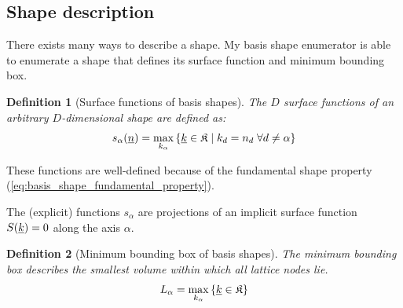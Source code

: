 \documentclass{article}
\newtheorem*{definition}{Definition}
\begin{document}
\subsection{Shape description}
There exists many ways to describe a shape. My basis shape enumerator
is able to enumerate a shape that defines its surface function and
minimum bounding box.

\begin{definition}[Surface functions of basis shapes]
  The \(D\) surface functions of an arbitrary \(D\)-dimensional shape are defined as:
  \begin{equation}
  s_{\alpha}(\underline{n})=\max_{k_{\alpha}}
    \left\{\underline{k} \in \mathfrak{K} \;|\;
      k_d = n_d \; \forall d \neq \alpha
    \right\}
    \label{eq:basis_shape_surface_function}
  \end{equation}
\end{definition}

These functions are well-defined because of the fundamental shape property
(\ref{eq:basis_shape_fundamental_property}).

The (explicit) functions \(s_{\alpha}\) are projections of an
implicit surface function \(S(\underline{k}) = 0\) along the axis \(\alpha\).

\begin{definition}[Minimum bounding box of basis shapes]
  The minimum bounding box describes the smallest
  volume within which all lattice nodes lie.
  \begin{equation}
    L_{\alpha}=\max_{k_{\alpha}}\left\{\underline{k} \in \mathfrak{K}\right\}
    \label{eq:basis_shape_bbox}
  \end{equation}
\end{definition}
\end{document}
